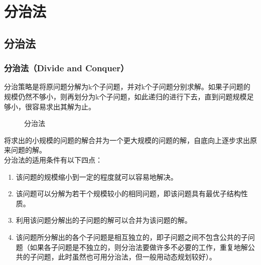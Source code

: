 \chapter{分治法}

\section{分治法}

\subsection{分治法（Divide and Conquer）}

分治策略是将原问题分解为k个子问题，并对k个子问题分别求解。如果子问题的规模仍然不够小，则再划分为k个子问题，如此递归的进行下去，直到问题规模足够小，很容易求出其解为止。 \\

\begin{figure}[H]
	\centering
	\caption{分治法}
\end{figure}

将求出的小规模的问题的解合并为一个更大规模的问题的解，自底向上逐步求出原来问题的解。 \\

分治法的适用条件有以下四点：

\begin{enumerate}
	\item 该问题的规模缩小到一定的程度就可以容易地解决。

	\item 该问题可以分解为若干个规模较小的相同问题，即该问题具有最优子结构性质。

	\item 利用该问题分解出的子问题的解可以合并为该问题的解。

	\item 该问题所分解出的各个子问题是相互独立的，即子问题之间不包含公共的子问题（如果各子问题是不独立的，则分治法要做许多不必要的工作，重复地解公共的子问题，此时虽然也可用分治法，但一般用动态规划较好）。
\end{enumerate}

